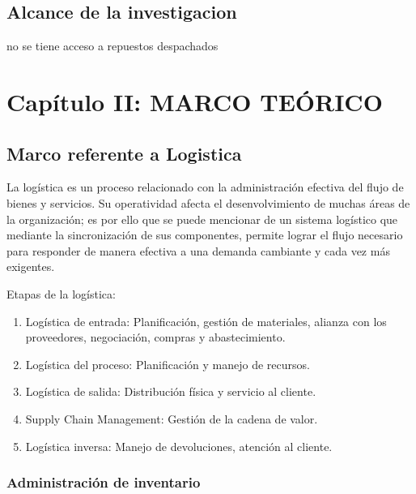 \documentclass[
]{article}
\providecommand{\tightlist}{%
  \setlength{\itemsep}{0pt}\setlength{\parskip}{0pt}}
\begin{document}
\hypertarget{alcance-de-la-investigacion}{%
\subsection{Alcance de la
investigacion}\label{alcance-de-la-investigacion}}

no se tiene acceso a repuestos despachados

\hypertarget{capuxedtulo-ii-marco-teuxf3rico}{%
\section{Capítulo II: MARCO
TEÓRICO}\label{capuxedtulo-ii-marco-teuxf3rico}}

\hypertarget{marco-referente-a-logistica}{%
\subsection{Marco referente a
Logistica}\label{marco-referente-a-logistica}}

La logística es un proceso relacionado con la administración efectiva
del flujo de bienes y servicios. Su operatividad afecta el
desenvolvimiento de muchas áreas de la organización; es por ello que se
puede mencionar de un sistema logístico que mediante la sincronización
de sus componentes, permite lograr el flujo necesario para responder de
manera efectiva a una demanda cambiante y cada vez más exigentes.

Etapas de la logística:

\begin{enumerate}
\def\labelenumi{\arabic{enumi}.}
\tightlist
\item
  Logística de entrada: Planificación, gestión de materiales, alianza
  con los proveedores, negociación, compras y abastecimiento.
\item
  Logística del proceso: Planificación y manejo de recursos.
\item
  Logística de salida: Distribución física y servicio al cliente.
\item
  Supply Chain Management: Gestión de la cadena de valor.
\item
  Logística inversa: Manejo de devoluciones, atención al cliente.
\end{enumerate}

\hypertarget{administraciuxf3n-de-inventario}{%
\subsubsection{Administración de
inventario}\label{administraciuxf3n-de-inventario}}
\end{document}
